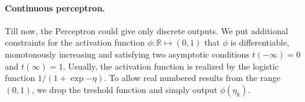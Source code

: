 \paragraph{Continuous perceptron.}
\label{sec:theory-perceptron-continuous} 
Till now, the Perceptron could give only discrete outputs. We put additional constraints for the activation function $\phi : \mathbb{R} \mapsto (0,1)$ that $\phi$ is differentiable, monotonously increasing and satisfying two asymptotic conditions $t(-\infty)=0$ and $t(\infty)=1$.  Usually, the activation function is realized by the logistic function $1 / (1 + \exp{-\eta})$. To allow real numbered results from the range $(0,1)$, we drop the treshold function and simply output $\phi(\eta_k)$. 
